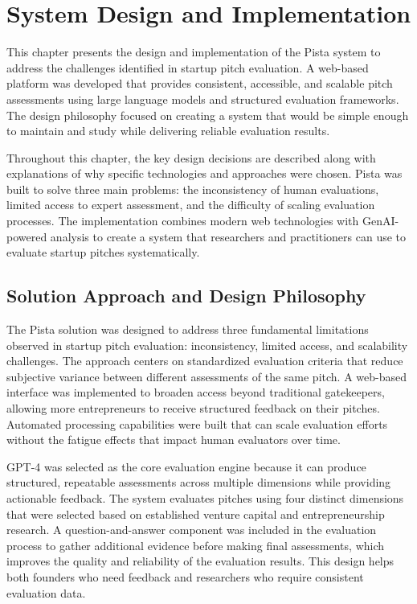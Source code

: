 \chapter{System Design and Implementation} \label{ch:problem-solution}

This chapter presents the design and implementation of the Pista system to address the challenges identified in startup pitch evaluation. A web-based platform was developed that provides consistent, accessible, and scalable pitch assessments using large language models and structured evaluation frameworks. The design philosophy focused on creating a system that would be simple enough to maintain and study while delivering reliable evaluation results.

Throughout this chapter, the key design decisions are described along with explanations of why specific technologies and approaches were chosen. Pista was built to solve three main problems: the inconsistency of human evaluations, limited access to expert assessment, and the difficulty of scaling evaluation processes. The implementation combines modern web technologies with GenAI-powered analysis to create a system that researchers and practitioners can use to evaluate startup pitches systematically.

\section{Solution Approach and Design Philosophy} \label{sec:solution-approach}

The Pista solution was designed to address three fundamental limitations observed in startup pitch evaluation: inconsistency, limited access, and scalability challenges. The approach centers on standardized evaluation criteria that reduce subjective variance between different assessments of the same pitch. A web-based interface was implemented to broaden access beyond traditional gatekeepers, allowing more entrepreneurs to receive structured feedback on their pitches. Automated processing capabilities were built that can scale evaluation efforts without the fatigue effects that impact human evaluators over time.

GPT-4 was selected as the core evaluation engine because it can produce structured, repeatable assessments across multiple dimensions while providing actionable feedback. The system evaluates pitches using four distinct dimensions that were selected based on established venture capital and entrepreneurship research. A question-and-answer component was included in the evaluation process to gather additional evidence before making final assessments, which improves the quality and reliability of the evaluation results. This design helps both founders who need feedback and researchers who require consistent evaluation data.

